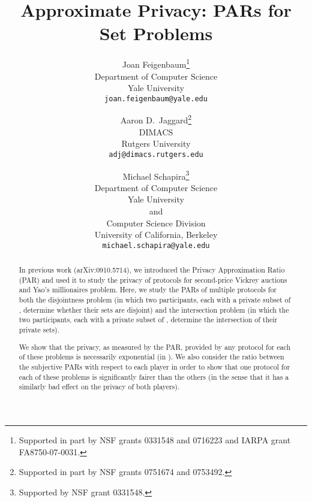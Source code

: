 \documentclass{article}
\theoremstyle{theorem}
\theoremstyle{definition}
\theoremstyle{remark}
\begin{document}
\title{Approximate Privacy: PARs for Set Problems}

\author{Joan Feigenbaum\thanks{Supported in part by NSF grants
0331548 and 0716223 and IARPA grant FA8750-07-0031.}\\
Department of Computer Science\\
Yale University\\
\texttt{joan.feigenbaum@yale.edu}
\and
Aaron D.\ Jaggard\thanks{Supported in part by
NSF grants 0751674 and 0753492.}\\
DIMACS\\
Rutgers University\\
\texttt{adj@dimacs.rutgers.edu}
\and Michael Schapira\thanks{Supported by NSF grant 0331548.}\\
Department of Computer Science\\
Yale University\\
and\\
Computer Science Division\\
University of California, Berkeley\\
\texttt{michael.schapira@yale.edu}
}


\date{}

\maketitle

\begin{abstract}
In previous work (arXiv:0910.5714), we introduced the Privacy Approximation Ratio (PAR) and used it to study the privacy of protocols for second-price Vickrey auctions and Yao's millionaires problem.  Here, we study the PARs of multiple protocols for both the disjointness problem (in which two participants, each with a private subset of , determine whether their sets are disjoint) and the intersection problem (in which the two participants, each with a private subset of , determine the intersection of their private sets).

We show that the privacy, as measured by the PAR, provided by any protocol for each of these problems is necessarily exponential (in ).  We also consider the ratio between the subjective PARs with respect to each player in order to show that one protocol for each of these problems is significantly fairer than the others (in the sense that it has a similarly bad effect on the privacy of both players).
\end{abstract}

\newpage
\end{document}
